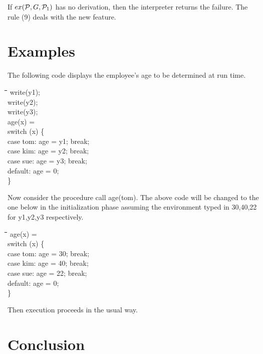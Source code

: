 \documentclass[12pt]{article}
\newcommand{\Pscr}{{\cal P}}
\newenvironment{exmple}{
 \begingroup \begin{tabbing} \hspace{2em}\= \hspace{3em}\= \hspace{3em}\=
\hspace{3em}\= \hspace{3em}\= \hspace{3em}\= \kill}{
 \end{tabbing}\endgroup}
\begin{document}
\noindent
If $ex(\Pscr,G,\Pscr_1)$ has no derivation, then the interpreter returns  the failure.
The rule (9)  deals with the new feature. 


\section{Examples }\label{sec:modules}

The following  code displays the employee's age to be determined at run time.

\begin{exmple}
 write(y1); \\
 write(y2); \\
 write(y3); \\
 age(x) =  \\
  \>      switch (x) \{ \\
 \>           case tom:  age = y1;   break; \\
  \>          case kim: age = y2;   break;\\
 \>           case sue: age = y3;    break;\\
 \>           default: age = 0;          \\
        \}\\
\end{exmple}

Now consider the procedure call age(tom). The above code will be changed to the one below in the initialization phase assuming
the environment typed in 30,40,22 for y1,y2,y3 respectively.

\begin{exmple}
 age(x) =  \\
\>        switch (x) \{ \\
 \>           case tom:  age = 30;   break; \\
  \>          case kim: age = 40;   break;\\
 \>           case sue: age = 22;    break;\\
 \>           default: age = 0;          \\
        \}\\
\end{exmple}


\noindent Then execution proceeds in the usual way.




\section{Conclusion}\label{sec:conc}
\end{document}
